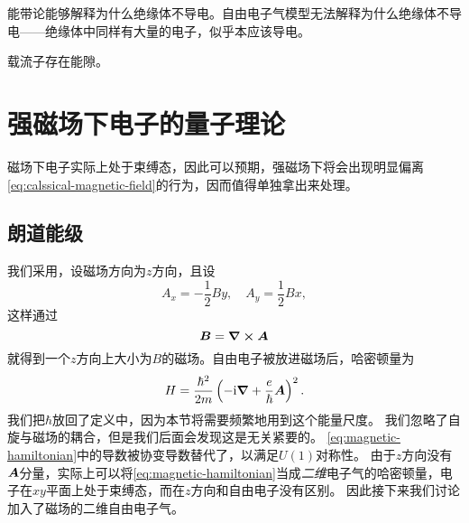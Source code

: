 能带论能够解释为什么绝缘体不导电。自由电子气模型无法解释为什么绝缘体不导电——绝缘体中同样有大量的电子，似乎本应该导电。

载流子存在能隙。%

\section{强磁场下电子的量子理论}

磁场下电子实际上处于束缚态，因此可以预期，强磁场下将会出现明显偏离\eqref{eq:calssical-magnetic-field}的行为，因而值得单独拿出来处理。

\subsection{朗道能级}

我们采用，设磁场方向为$z$方向，且设
\begin{equation}
    A_x = - \frac{1}{2} B y, \quad A_y = \frac{1}{2} B x,
\end{equation}
这样通过
\[
    \vb*{B} = \curl{\vb*{A}}
\]
就得到一个$z$方向上大小为$B$的磁场。自由电子被放进磁场后，哈密顿量为
\begin{equation}
    {H} = \frac{\hbar^2}{2m} \left( - \mathrm{i} \grad + \frac{e}{\hbar} \vb*{A} \right)^2.
    \label{eq:magnetic-hamiltonian}
\end{equation}
我们把$\hbar$放回了定义中，因为本节将需要频繁地用到这个能量尺度。
我们忽略了自旋与磁场的耦合，但是我们后面会发现这是无关紧要的。
\eqref{eq:magnetic-hamiltonian}中的导数被协变导数替代了，以满足$U(1)$对称性。
由于$z$方向没有$\vb*{A}$分量，实际上可以将\eqref{eq:magnetic-hamiltonian}当成\emph{二维}电子气的哈密顿量，电子在$xy$平面上处于束缚态，而在$z$方向和自由电子没有区别。
因此接下来我们讨论加入了磁场的二维自由电子气。


